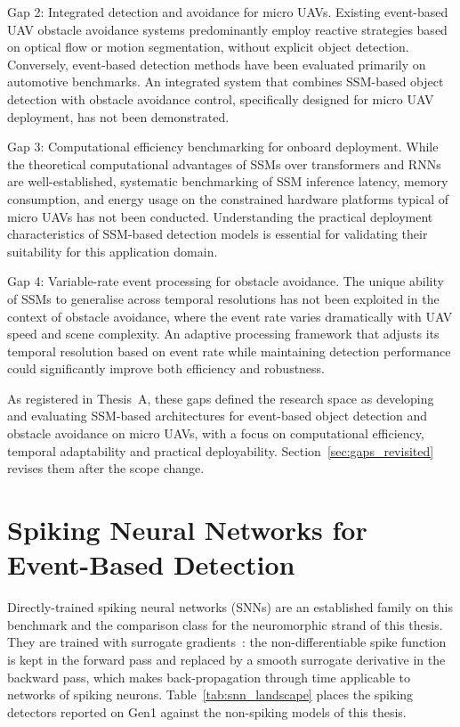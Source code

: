 \documentclass[11pt, a4paper]{report}
\begin{document}
Gap 2: Integrated detection and avoidance for micro UAVs. Existing event-based UAV obstacle avoidance systems \cite{falanga2020dynamic, sanket2020evdodgenet} predominantly employ reactive strategies based on optical flow or motion segmentation, without explicit object detection. Conversely, event-based detection methods \cite{perot2020learning,gehrig2023recurrent} have been evaluated primarily on automotive benchmarks. An integrated system that combines SSM-based object detection with obstacle avoidance control, specifically designed for micro UAV deployment, has not been demonstrated. 

Gap 3: Computational efficiency benchmarking for onboard deployment. While the theoretical computational advantages of SSMs over transformers and RNNs are well-established, systematic benchmarking of SSM inference latency, memory consumption, and energy usage on the constrained hardware platforms typical of micro UAVs has not been conducted. Understanding the practical deployment characteristics of SSM-based detection models is essential for validating their suitability for this application domain. 

Gap 4: Variable-rate event processing for obstacle avoidance. The unique ability of SSMs to generalise across temporal resolutions \cite{zubic2024state} has not been exploited in the context of obstacle avoidance, where the event rate varies dramatically with UAV speed and scene complexity. An adaptive processing framework that adjusts its temporal resolution based on event rate while maintaining detection performance could significantly improve both efficiency and robustness. 

As registered in Thesis~A, these gaps defined the research space as developing and evaluating SSM-based architectures for event-based object detection and obstacle avoidance on micro UAVs, with a focus on computational efficiency, temporal adaptability and practical deployability. Section~\ref{sec:gaps_revisited} revises them after the scope change. 




\section{Spiking Neural Networks for Event-Based Detection}
\label{sec:snn_detection}
Directly-trained spiking neural networks (SNNs) are an established family on this benchmark and the
comparison class for the neuromorphic strand of this thesis. They are trained with surrogate
gradients~\cite{neftci2019surrogate}: the non-differentiable spike function is kept in the forward pass
and replaced by a smooth surrogate derivative in the backward pass, which makes back-propagation through
time applicable to networks of spiking neurons. Table~\ref{tab:snn_landscape} places the spiking detectors
reported on Gen1 against the non-spiking models of this thesis.
\end{document}
